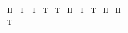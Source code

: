 {\begin{tabular}[t]{|l|l|l|l|l|l|l|l|l|l|}
     \tabularnewline\cline{1-1}\cline{2-2}\cline{3-3}\cline{4-4}\cline{5-5}\cline{6-6}\cline{7-7}\cline{8-8}\cline{9-9}\cline{10-10}
        H &
        T &
        T &
        T &
        T &
        H &
        T &
        T &
        H &
        H%
     \tabularnewline\cline{1-1}\cline{2-2}\cline{3-3}\cline{4-4}\cline{5-5}\cline{6-6}\cline{7-7}\cline{8-8}\cline{9-9}\cline{10-10}
        T &

\end{tabular}}
